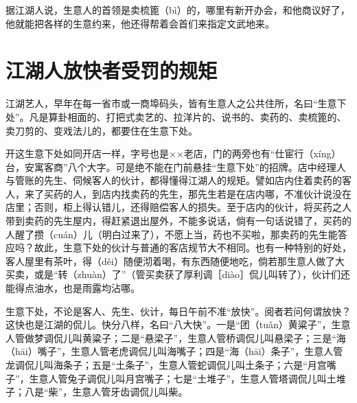 \documentclass[12pt,UTF8]{ctexbook}
\begin{document}
据江湖人说，生意人的首领是卖梳篦（bì）的，哪里有新开办会，和他商议好了，他就能把各样的生意约来，他还得帮着会首们来指定文武地来。





\section{江湖人放快者受罚的规矩}


江湖艺人，早年在每一省市或一商埠码头，皆有生意人之公共住所，名曰“生意下处”。凡是算卦相面的、打把式卖艺的、拉洋片的、说书的、卖药的、卖梳篦的、卖刀剪的、变戏法儿的，都要住在生意下处。

开这生意下处如同开店一样，字号也是××老店，门的两旁也有“仕宦行（xíng）台，安寓客商”八个大字。可是绝不能在门前悬挂“生意下处”的招牌。店中经理人与管账的先生、伺候客人的伙计，都得懂得江湖人的规矩。譬如店内住着卖药的客人，来了买药的人，到店内找卖药的先生，那先生若是在店内哪，不准伙计说没在店里；否则，柜上得认错儿，还得赔偿客人的损失。至于店内的伙计，将买药之人带到卖药的先生屋内，得赶紧退出屋外，不能多说话，倘有一句话说错了，买药的人醒了攒（cuán）儿（明白过来了），不愿上当，药也不买啦，那卖药的先生能答应吗？故此，生意下处的伙计与普通的客店规节大不相同。也有一种特别的好处，客人屋里有茶叶，得（děi）随便沏着喝，有东西随便地吃，倘若那生意人做了大买卖，或是“转（zhuàn）了”（管买卖获了厚利调［diào］侃儿叫转了），伙计们还能得点油水，也是雨露均沾哪。

生意下处，不论是客人、先生、伙计，每日午前不准“放快”。阅者若问何谓放快？这快也是江湖的侃儿。快分八样，名曰“八大快”。一是“团（tuǎn）黄粱子”，生意人管做梦调侃儿叫黄粱子；二是“悬梁子”，生意人管桥调侃儿叫悬梁子；三是“海（hāi）嘴子”，生意人管老虎调侃儿叫海嘴子；四是“海（hāi）条子”，生意人管龙调侃儿叫海条子；五是“土条子”，生意人管蛇调侃儿叫土条子；六是“月宫嘴子”，生意人管兔子调侃儿叫月宫嘴子；七是“土堆子”，生意人管塔调侃儿叫土堆子；八是“柴”，生意人管牙齿调侃儿叫柴。
\end{document}
